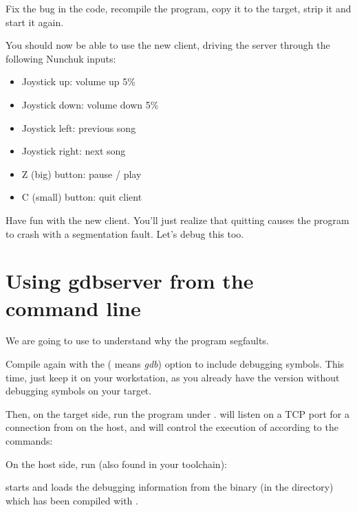Fix the bug in the code, recompile the program, copy it to
the target, strip it and start it again.

You should now be able to use the new client, driving the server
through the following Nunchuk inputs:

\begin{itemize}
   \item Joystick up: volume up 5\%
   \item Joystick down: volume down 5\%
   \item Joystick left: previous song
   \item Joystick right: next song
   \item Z (big) button: pause / play
   \item C (small) button: quit client
\end{itemize}

Have fun with the new client. You'll just realize that quitting
causes the program to crash with a segmentation fault. Let's debug this
too.

\section{Using gdbserver from the command line}

We are going to use  to understand why the program
segfaults.

Compile  again with the  (
means {\em gdb}) option to include debugging symbols. This time, just
keep it on your workstation, as you already have the version without
debugging symbols on your target.

Then, on the target side, run the program under .
 will listen on a TCP port for a connection from
 on the host, and will control the execution of
 according to the  commands:


On the host side, run  (also found in your toolchain):
\begin{bashinput}
$ %
\end{bashinput}

 starts and loads the debugging information from the
 binary (in the  directory)
which has been compiled with .

